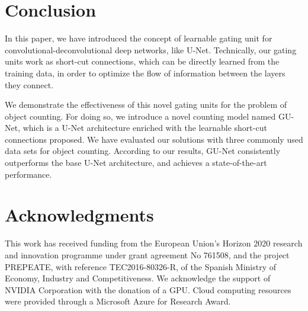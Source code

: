 \documentclass{bmvc2k}
\begin{document}
\section{Conclusion}

In this paper, we have introduced the concept of learnable gating unit for convolutional-deconvolutional deep networks, like U-Net. Technically, our gating units work as short-cut connections, which can be directly learned from the training data, in order to optimize the flow of information between the layers they connect.

We demonstrate the effectiveness of this novel gating units for the problem of object counting. For doing so, we introduce a novel counting model named GU-Net, which is a U-Net architecture enriched with the learnable short-cut connections proposed. We have evaluated our solutions with three commonly used data sets for object counting. According to our results, GU-Net consistently outperforms the base U-Net architecture, and achieves a state-of-the-art performance.

\section*{Acknowledgments}
This work has received funding from the European Union's Horizon 2020 research and innovation programme under grant agreement No 761508, and the project PREPEATE, with reference TEC2016-80326-R, of the Spanish Ministry of Economy, Industry and Competitiveness. We acknowledge the support of NVIDIA Corporation with the donation of a GPU. Cloud computing resources were provided through a Microsoft Azure for Research Award.


\end{document}
